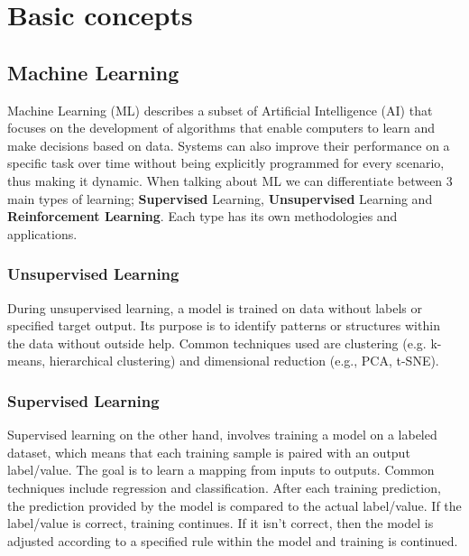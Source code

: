 \section{Basic concepts}

\subsection{Machine Learning}
Machine Learning (ML) describes a subset of Artificial Intelligence (AI) that focuses on the development of algorithms that enable computers to learn and make decisions based on data. Systems can also improve their performance on a specific task over time without being explicitly programmed for every scenario, thus making it dynamic. \cite{Bishop-ML} When talking about ML we can differentiate between 3 main types of learning; \textbf{Supervised} Learning, \textbf{Unsupervised} Learning and \textbf{Reinforcement Learning}. Each type has its own methodologies and applications.

\subsubsection{Unsupervised Learning}
During unsupervised learning, a model is trained on data without labels or specified target output. Its purpose is to identify patterns or structures within the data without outside help. Common techniques used are clustering (e.g. k-means, hierarchical clustering) and dimensional reduction (e.g., PCA, t-SNE).

\subsubsection{Supervised Learning}
Supervised learning on the other hand, involves training a model on a labeled dataset, which means that each training sample is paired with an output label/value. The goal is to learn a mapping from inputs to outputs. Common techniques include regression and classification. After each training prediction, the prediction provided by the model is compared to the actual label/value. If the label/value is correct, training continues. If it isn't correct, then the model is adjusted according to a specified rule within the model and training is continued.

